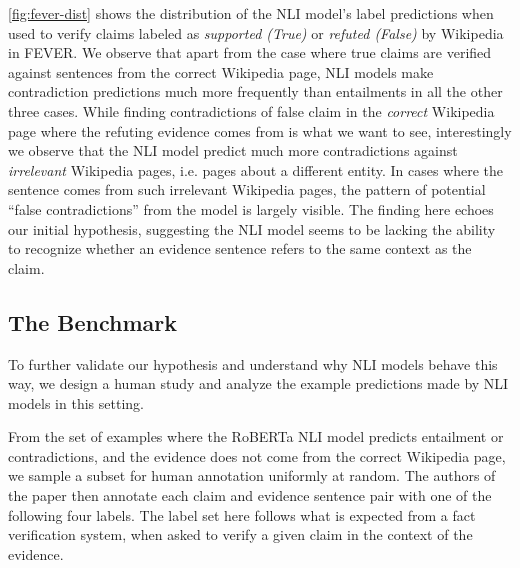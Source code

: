 \autoref{fig:fever-dist} shows the distribution of the NLI model's label predictions when used to verify claims labeled as \textit{supported (True)} or \textit{refuted (False)} by Wikipedia in FEVER. 
We observe that apart from the case where true claims are verified against sentences from the correct Wikipedia page, NLI models make contradiction predictions much more frequently than entailments in all the other three cases. 
While finding contradictions of false claim in the \textit{correct}  Wikipedia page where the refuting evidence comes from is what we want to see, interestingly we observe that the NLI model predict much more contradictions against \emph{irrelevant} Wikipedia pages, i.e. pages about a different entity. 
In cases where the sentence comes from such irrelevant Wikipedia pages, the pattern of potential ``false contradictions'' from the model is largely visible. 
The finding here echoes our initial hypothesis, suggesting the NLI model seems to be lacking the ability to recognize whether an evidence sentence refers to the same context as the claim.


\subsection{The \datasetname Benchmark}
\label{ssec:benchmark}
To further validate our hypothesis and understand why NLI models behave this way, we design a human study and analyze the example predictions made by NLI models in this setting.

From the set of examples where the RoBERTa NLI model predicts entailment or contradictions, and the evidence does not come from the correct Wikipedia page, we sample a subset for human annotation uniformly at random. The authors of the paper then annotate each claim and evidence sentence pair with one of the following four labels. The label set here follows what is expected from a fact verification system, when asked to verify a given claim in the context of the evidence.

